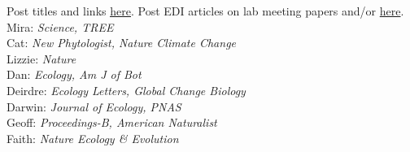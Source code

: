 \documentclass[11pt]{article}
\begin{document}
\vspace{7pt}
 Post titles and links \href{https://docs.google.com/document/d/1j0WdDbjdp8ERLSO7whvtnP-tOblYMlX33TSCXy_uRKo/edit?usp=sharing}{\underline{here}}. Post EDI articles on lab meeting papers and/or  \href{https://docs.google.com/document/d/18VbP-03oD0BsArxYm60g1ZvvFL7IoA3-6rpdHb1eLPw/edit#heading=h.gsqcglkhxkzg}{here}.\\
Mira: \emph{Science, TREE} \\
Cat: \emph{New Phytologist, Nature Climate Change}\\
Lizzie: \emph{Nature}\\
Dan: \emph{Ecology, Am J of Bot }\\
Deirdre: \emph{Ecology Letters, Global Change Biology}\\
Darwin: \emph{Journal of Ecology, PNAS}\\
Geoff: \emph{Proceedings-B, American Naturalist} \\
Faith: \emph{Nature Ecology \& Evolution}\\
\end{document}
